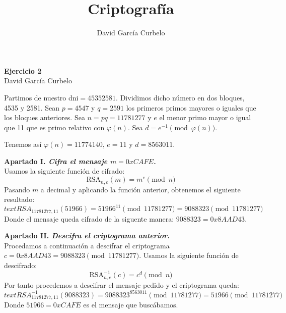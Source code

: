 \documentclass[fleqn]{article}
\author{David García Curbelo}
\title{Criptografía}
\begin{document}
    \begin{center}
        \LARGE{\textbf{Ejercicio 2}} \\
        \Large{David García Curbelo} \\
    \end{center}

    \vspace{1cm}

    Partimos de nuestro dni$= 45352581$. Dividimos dicho número en dos bloques, 4535 y 2581. Sean $p = 4547$ y $q = 2591$ los 
    primeros primos mayores o iguales que los bloques anteriores. Sea $n = pq = 11781277$ y $e$ el menor primo mayor o igual que
    11 que es primo relativo con $\varphi(n)$. Sea $d = e^{-1} \pmod{\varphi(n)}$.

    Tenemos así $\varphi(n) = 11774140$, $e = 11$ y $d = 8563011$.

    \vspace{1cm}

    \textbf{Apartado I. \textit{Cifra el mensaje $m = 0xCAFE$.}}\\
    Usamos la siguiente función de cifrado:
    $$\text{RSA}_{n,e} (m) = m^e \pmod{n}$$
    Pasando $m$ a decimal y aplicando la función anterior, obtenemos el siguiente resultado:
    $$text{RSA}_{11781277, 11} (51966) = 51966^{11} \pmod{11781277} = 9088323 \pmod{11781277}$$
    Donde el mensaje queda cifrado de la siguente manera: $9088323 = 0x8AAD43$.


    \newpage
    \textbf{Apartado II. \textit{Descifra el criptograma anterior.}}\\
    Procedamos a continuación a descifrar el criptograma $c = 0x8AAD43 = 9088323 \pmod{11781277}$. Usamos la siguiente función de 
    descifrado:
    $$\text{RSA}_{n,e}^{-1} (c) = c^d \pmod{n}$$
    Por tanto procedemos a descifrar el mensaje pedido y el criptograma queda:
    $$text{RSA}_{11781277, 11}^{-1} (9088323) = 9088323^{8563011} \pmod{11781277} = 51966 \pmod{11781277}$$
    Donde $51966 = 0xCAFE$ es el mensaje que buscábamos.
\end{document}
